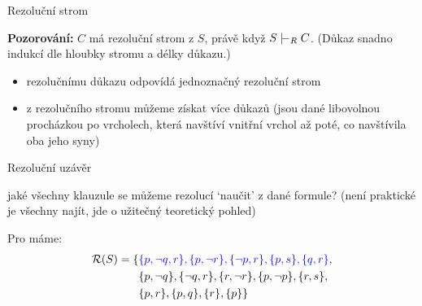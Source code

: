 \documentclass{beamer}
\begin{document}
\begin{frame}{Rezoluční strom}


    \medskip

    \textbf{Pozorování:} $C$ má rezoluční strom z $S$, právě když $S\proves_R C$. (Důkaz snadno indukcí dle hloubky stromu a délky důkazu.)
    \begin{itemize}
        \item rezolučnímu důkazu odpovídá \alert{jednoznačný} rezoluční strom
        \item z rezolučního stromu můžeme získat více důkazů (jsou dané libovolnou procházkou po vrcholech, která navštíví vnitřní vrchol až poté, co navštívila oba jeho syny)
    \end{itemize}

\end{frame}


\begin{frame}{Rezoluční uzávěr}
    
    jaké všechny klauzule se můžeme rezolucí \alert{`naučit'} z dané formule? (není praktické je všechny najít, jde o užitečný teoretický pohled)
    
    \medskip

    
    \bigskip

    Pro  máme:
    \begin{align*}
        \mathcal R(S)=\{&\textcolor{blue}{\{p,\neg q,r\},\{p,\neg r\},\{\neg p,r\},\{p,s\},\{q,r\}},\\&\{p,\neg q\},\{\neg q,r\},\{r,\neg r\},\{p,\neg p\},\{r,s\},\\&
        \{p,r\},\{p,q\},\{r\},\{p\}\}
    \end{align*}

\end{frame}
\end{document}
